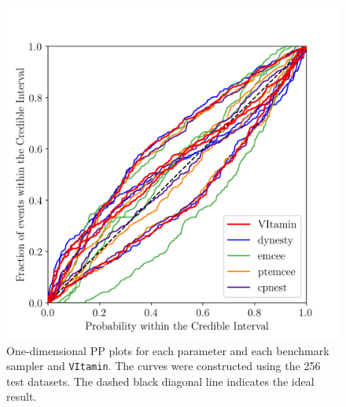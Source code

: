 \documentclass[%
showpacs,
 amsmath,amssymb,
 aps,
 twocolumn,
 prl,
 reprint,
floatfix,
]{revtex4-1}
\newcommand{\chris}[1]{\textbf{\textcolor{red}{CHRIS: #1}}}
\newcommand{\hunter}[1]{\textbf{\textcolor{blue}{HUNTER: #1}}}
\begin{document}

%
%
\begin{figure}
    \includegraphics[width=\columnwidth]{images/latest_pp_plot.png}
    \caption{\label{fig:pp_plot} One-dimensional \ac{PP} plots for each
parameter and each benchmark sampler and \texttt{VItamin}.  The curves were
constructed using the 256 test datasets. The dashed black diagonal line
indicates the ideal result.   
}
\end{figure}
%
\end{document}
